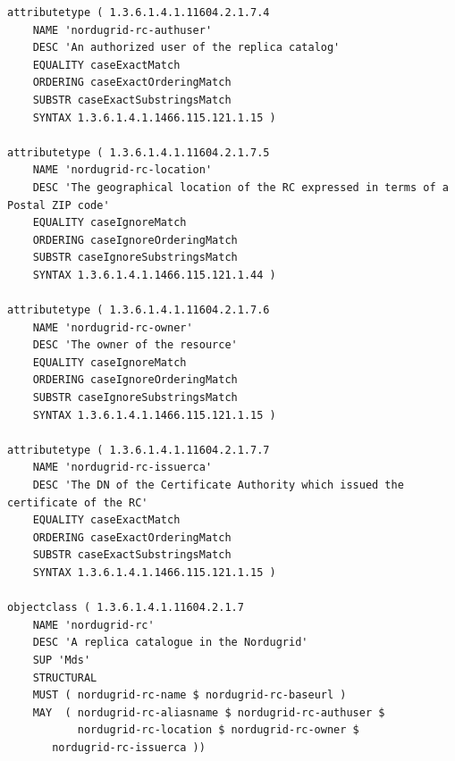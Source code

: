 \documentclass{article}
\begin{document}
\begin{verbatim}
attributetype ( 1.3.6.1.4.1.11604.2.1.7.4
    NAME 'nordugrid-rc-authuser'
    DESC 'An authorized user of the replica catalog'
    EQUALITY caseExactMatch
    ORDERING caseExactOrderingMatch
    SUBSTR caseExactSubstringsMatch
    SYNTAX 1.3.6.1.4.1.1466.115.121.1.15 )   

attributetype ( 1.3.6.1.4.1.11604.2.1.7.5
    NAME 'nordugrid-rc-location'
    DESC 'The geographical location of the RC expressed in terms of a Postal ZIP code'
    EQUALITY caseIgnoreMatch
    ORDERING caseIgnoreOrderingMatch
    SUBSTR caseIgnoreSubstringsMatch
    SYNTAX 1.3.6.1.4.1.1466.115.121.1.44 )
    
attributetype ( 1.3.6.1.4.1.11604.2.1.7.6
    NAME 'nordugrid-rc-owner'
    DESC 'The owner of the resource'
    EQUALITY caseIgnoreMatch
    ORDERING caseIgnoreOrderingMatch
    SUBSTR caseIgnoreSubstringsMatch
    SYNTAX 1.3.6.1.4.1.1466.115.121.1.15 )
        
attributetype ( 1.3.6.1.4.1.11604.2.1.7.7
    NAME 'nordugrid-rc-issuerca'
    DESC 'The DN of the Certificate Authority which issued the certificate of the RC'
    EQUALITY caseExactMatch
    ORDERING caseExactOrderingMatch
    SUBSTR caseExactSubstringsMatch
    SYNTAX 1.3.6.1.4.1.1466.115.121.1.15 )          
    
objectclass ( 1.3.6.1.4.1.11604.2.1.7
    NAME 'nordugrid-rc'
    DESC 'A replica catalogue in the Nordugrid'
    SUP 'Mds'
    STRUCTURAL
    MUST ( nordugrid-rc-name $ nordugrid-rc-baseurl )
    MAY  ( nordugrid-rc-aliasname $ nordugrid-rc-authuser $
    	   nordugrid-rc-location $ nordugrid-rc-owner $
	   nordugrid-rc-issuerca ))


\end{verbatim}
\newpage
\end{document}
